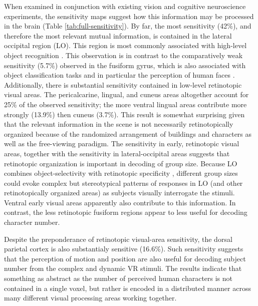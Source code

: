 \documentclass[preprint,5p,authoryear]{elsarticle}
\begin{document}
When examined in conjunction with existing vision and cognitive neuroscience experiments, the sensitivity maps suggest how this information may be processed in the brain (Table \ref{tab:full-sensitivity}).
By far, the most sensitivity (42\%), and therefore the most relevant mutual information, is contained in the lateral occipital region (LO).
This region is most commonly associated with high-level object recognition \citep{Grill-Spector2001}.
This observation is in contrast to the comparatively weak sensitivity (5.7\%) observed in the fusiform gyrus, which is also associated with object classification tasks and in particular the perception of human faces \citep{Kanwisher1997}.
Additionally, there is substantial sensitivity contained in low-level retinotopic visual areas. 
The pericalcarine, lingual, and cuneus areas altogether account for 25\% of the observed sensitivity; the more ventral lingual areas contribute more strongly (13.9\%) then cuneus (3.7\%).
This result is somewhat surprising given that the relevant information in the scene is not necessarily retinotopically organized because of the randomized arrangement of buildings and characters as well as the free-viewing paradigm.
The sensitivity in early, retinotopic visual areas, together with the sensitivity in lateral-occipital areas suggests that retinotopic organization is important in decoding of group size. 
Because LO combines object-selectivity with retinotopic specificity \citep{Sayres2008}, different group sizes could evoke complex but stereotypical patterns of responses in LO (and other retinotopically organized areas) as subjects visually interrogate the stimuli. 
Ventral early visual areas apparently also contribute to this information. 
In contrast, the less retinotopic fusiform regions \citep{Schwarzlose2008,Sayres2010} appear to less useful for decoding character number.

Despite the preponderance of retinotopic visual-area sensitivity, the dorsal parietal cortex is also substantialy sensitive (16.6\%). 
Such sensitivity suggests that the perception of motion and position are also useful for decoding subject number from the complex and dynamic VR stimuli.
The results indicate that something as abstract as the number of perceived human characters is not contained in a single voxel, but rather is encoded in a distributed manner across many different visual processing areas working together.
\end{document}
